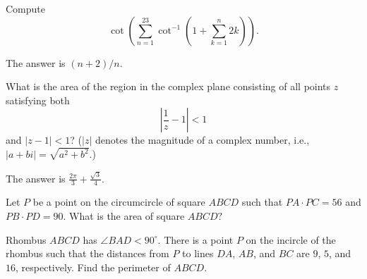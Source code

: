 %	



\begin{question}[name={2022 Stanford Math Tournament, \href{https://artofproblemsolving.com/community/c383h3040234p27370695}{Algebra \#6}}]
	Compute
	\[\cot\left(\sum_{n=1}^{23}\cot^{-1}\left(1+\sum_{k=1}^n2k\right)\right).\]
\end{question}



\begin{solution}%
	The answer is $\boxed{(n+2)/n}$.
\end{solution}


\begin{question}[name={2022 Stanford Math Tournament, \href{https://artofproblemsolving.com/community/c383h3041180p27382234}{Algebra Tiebreaker \#2}}]
	What is the area of the region in the complex plane consisting of all points $z$ satisfying both $$\left|\frac{1}{z}-1\right|<1$$ and $|z-1|<1$? ($|z|$ denotes the magnitude of a complex number, i.e., $|a+bi|=\sqrt{a^2+b^2}$.)
\end{question}



\begin{solution}%
	The answer is $\boxed{\tfrac{2\pi}{3}+\tfrac{\sqrt{3}}{4}}$.
\end{solution}






\begin{question}[name={2023 AIME I, \href{https://artofproblemsolving.com/community/c4p27048721}{Problem 5}}]
	Let $P$ be a point on the circumcircle of square $ABCD$ such that $PA \cdot PC = 56$ and $PB \cdot PD = 90.$ What is the area of square $ABCD?$
\end{question}


%	












\begin{question}[name={2023 AIME I, \href{https://artofproblemsolving.com/community/c4p27048785}{Problem 8}}]
	Rhombus $ABCD$ has $\angle BAD<90^{\circ}$. There is a point $P$ on the incircle of the rhombus such that the distances from $P$ to lines $DA$, $AB$, and $BC$ are $9$, $5$, and $16$, respectively. Find the perimeter of $ABCD$.
\end{question}


